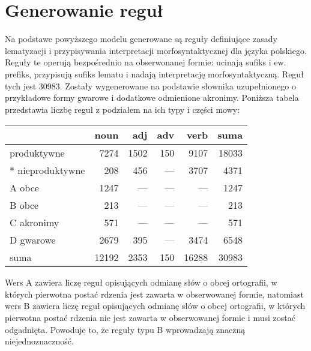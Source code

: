 \documentclass{article}
\begin{document}
\section{Generowanie reguł}
Na podstawe powyższego modelu generowane są reguły definiujące zasady lematyzacji i przypisywania interpretacji morfosyntaktycznej dla języka polskiego.
Reguły te operują bezpośrednio na obserwonanej formie: ucinają sufiks i ew. prefiks, przypisują sufiks lematu i nadają interpretację morfosyntaktyczną.
Reguł tych jest 30983. Zostały wygenerowane na podstawie słownika uzupełnionego o przykładowe formy gwarowe i dodatkowe odmienione akronimy.
Poniższa tabela przedstawia liczbę reguł z podziałem na ich typy i części mowy:
\begin{center} %
\begin{tabular}{l|r|r|r|r|r}
                 &  noun &  adj & adv &  verb &  suma \\
\hline
produktywne      &  7274 & 1502 & 150 &  9107 & 18033 \\
\hline
* nieproduktywne &   208 &  456 & --- &  3707 &  4371 \\
\hline
A obce           &  1247 &  --- & --- &   --- &  1247 \\
\hline
B obce           &   213 &  --- & --- &   --- &   213 \\
\hline
C akronimy       &   571 &  --- & --- &   --- &   571 \\
\hline
D gwarowe        &  2679 &  395 & --- &  3474 &  6548  \\
\hline
suma             & 12192 & 2353 & 150 & 16288 & 30983  \\
\end{tabular}
\end{center}
Wers A zawiera liczę reguł opisujących odmianę słów o obcej ortografii, w których pierwotna postać rdzenia jest zawarta w obserwowanej formie,
natomiast wers B zawiera liczę reguł opisujących odmianę słów o obcej ortografii, w których pierwotna postać rdzenia nie jest zawarta w obserwowanej formie i musi zostać odgadnięta.
Powoduje to, że reguły typu B wprowadzają znaczną niejednoznaczność.
\end{document}
